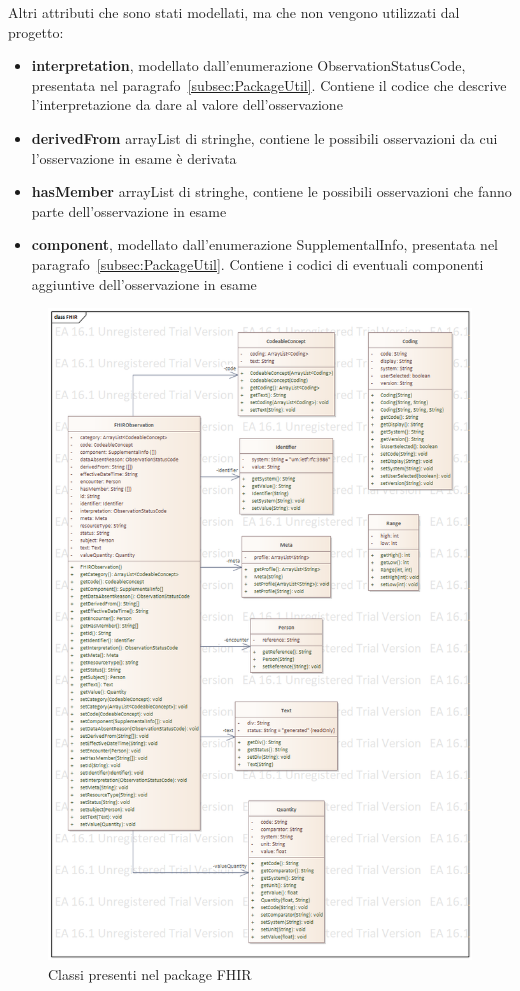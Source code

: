 \documentclass[a4paper]{article}
\begin{document}
\begin{itemize}
    Altri attributi che sono stati modellati, ma che non vengono utilizzati dal progetto:
    \begin{itemize}
        \item \textbf{interpretation}, modellato dall'enumerazione ObservationStatusCode, presentata nel paragrafo~\ref{subsec:PackageUtil}. Contiene il codice che descrive l'interpretazione da dare al valore dell'osservazione
        \item \textbf{derivedFrom} arrayList di stringhe, contiene le possibili osservazioni
        da cui l'osservazione in esame è derivata
        \item \textbf{hasMember} arrayList di stringhe, contiene le possibili osservazioni che fanno parte dell'osservazione in esame
        \item \textbf{component}, modellato dall'enumerazione SupplementalInfo, presentata nel paragrafo~\ref{subsec:PackageUtil}. Contiene i codici di eventuali componenti aggiuntive dell'osservazione in esame
    \end{itemize}
\end{itemize}
\begin{figure}[H]
    \centering
    \includegraphics[width=1\linewidth]{figures/FHIR.png}
    \caption{Classi presenti nel package FHIR}
    \label{fig:fhir}
\end{figure}
\end{document}
